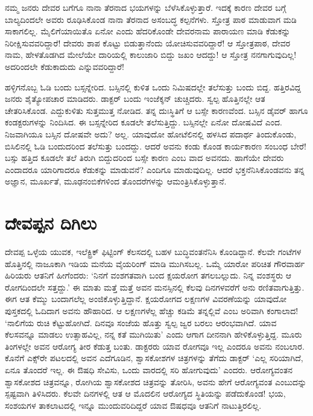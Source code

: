 ನಮ್ಮ ಜನರು ದೇವರ ಬಗೆಗೂ ನಾನಾ ತೆರನಾದ ಭಯಗಳನ್ನು ಬೆಳೆಸಿಕೊಳ್ಳುತ್ತಾರೆ. ಇದಕ್ಕೆ ಕಾರಣ ದೇವರ ಬಗ್ಗೆ ಬಾಲ್ಯದಿಂದಲೇ ಅವರು ರೂಢಿಸಿಕೊಂಡ ನಾನಾ ತೆರನಾದ ಅಸಂಬದ್ಧ ಕಲ್ಪನೆಗಳು. ಸ್ತೋತ್ರ ಪಾಠ ಮಾಡುವಾಗ ಮಡಿ ಸಾಕಾಗಲಿಲ್ಲ. ಮೈಲಿಗೆಯಾಯಿತೊ ಏನೋ ಎಂದು ಹೆದರಿಕೊಂಡೇ ದೇವರನಾಮ ಪಾರಾಯಣ ಮಾಡಿ ಕೆಡುಕನ್ನು ನಿರೀಕ್ಷಿಸುವವರಿದ್ದಾರೆ! ದೇವರು ಶಾಪ ಕೊಟ್ಟು ಬಿಡುತ್ತಾನೆಂದು ಯೋಚಿಸುವವರಿದ್ದಾರೆ! ಆ ಸ್ತೋತ್ರಪಾಠ, ದೇವರ ನಾಮ, ಹೇಳತೊಡಗಿದ ಮೇಲೆಯೇ ದಾರಿಯಲ್ಲಿ ಕಾಲುಜಾರಿ ಬಿದ್ದು ಜಖಂ ಆದದ್ದು! ಆ ಸ್ತೋತ್ರ ನನಗಾಗುವುದಿಲ್ಲ! ಅದರಿಂದಲೇ ಕೆಡುಕಾದುದು ಎನ್ನುವವರಿದ್ದಾರೆ!

ಹಳ್ಳಿಗನೊಬ್ಬ ಓಡಿ ಬಂದು ಬಸ್ಸನ್ನೇರಿದ. ಬಸ್ಸಿನಲ್ಲಿ ಕುಳಿತ ಒಂದು ನಿಮಿಷದಲ್ಲೇ ತಲೆಸುತ್ತು ಬಂದು ಬಿದ್ದ. ಹತ್ತಿರವಿದ್ದ ಜನರು ಶೈತ್ಯೋಪಚಾರ ಮಾಡಿದರು. ಡಾಕ್ಟರ್ ಬಂದು ಇಂಜೆಕ್ಶನ್ ಚುಚ್ಚಿದರು. ಸ್ವಲ್ಪ ಹೊತ್ತಿನಲ್ಲೇ ಆತ ಚೇತರಿಸಿಕೊಂಡ. ಎದ್ದುಕುಳಿತು ಸುತ್ತಮುತ್ತ ನೋಡಿದ. ತನ್ನ ದುಃಸ್ಥಿತಿಗೆ ಆ ಬಸ್ಸೇ ಕಾರಣವೆಂದ. ಬಸ್ಸಿನ ಡೈವರ್ ಹಾಗೂ ಕಂಡಕ್ಟರುಗಳನ್ನು ನಿಂದಿಸಿದ. ಈ ಬಸ್ಸನ್ನೇರಿದ ಕೂಡಲೇ ತಲೆಸುತ್ತಿದ್ದು. ಬಸ್ಸಿನಲ್ಲೇ ಏನೋ ದೋಷವಿದೆ ಎಂದ. ನಿಜವಾಗಿಯೂ ಬಸ್ಸಿನ ದೋಷವೇ ಅದು? ಅಲ್ಲ. ಯಾವುದೋ ಹೋಟೆಲಿನಲ್ಲಿ ಹಳಸಿದ ಪದಾರ್ಥ ತಿಂದುಕೊಂಡು, ಬಿಸಿಲಿನಲ್ಲಿ ಓಡಿ ಬಂದುದರಿಂದ ತಲೆಸುತ್ತು ಬಂದದ್ದು. ಆದರೆ ಅವನು ಕಂಡು ಕೊಂಡ ಕಾರ್ಯಕಾರಣ ಸಂಬಂಧ ಬೇರೆ! ಬಸ್ಸು ಹತ್ತಿದ ಕೂಡಲೇ ತಲೆ ತಿರುಗಿ ಬಿದ್ದುದರಿಂದ ಬಸ್ಸೇ ಕಾರಣ ಎಂಬ ವಾದ ಅವನದು. ಹಾಗೆಯೇ ದೇವರು ಎಂದಾದರೂ ಯಾರಿಗಾದರೂ ಕೆಡುಕನ್ನು ಮಾಡುವನೆ? ಎಂದಿಗೂ ಮಾಡುವುದಿಲ್ಲ. ಆದರೆ ಭಕ್ತನೆನಿಸಿಕೊಂಡವನು ತನ್ನ ಅಜ್ಞಾನ, ಮೂರ್ಖತೆ, ಮೂಢನಂಬಿಕೆಗಳಿಂದ ತೊಂದರೆಗಳನ್ನು ಆಮಂತ್ರಿಸಿಕೊಳ್ಳುತ್ತಾನೆ.


\section*{ದೇವಪ್ಪನ ದಿಗಿಲು}

\vskip -6pt

ದೇವಪ್ಪ ಒಳ್ಳೆಯ ಯುವಕ, ಇಲೆಕ್ಟ್ರಿಕ್ ಫಿಟ್ಟಿಂಗ್ ಕೆಲಸದಲ್ಲಿ ಬಹಳ ಬುದ್ಧಿವಂತನೆನಿಸಿ ಕೊಂಡಿದ್ದಾನೆ. ಕೆಲವೇ ಗಂಟೆಗಳ ಹೊತ್ತಿನಲ್ಲಿ ನಾಜೂಕಾಗಿ ಇಡಿಯ ಮನೆಯ ವೈಯರಿಂಗ್ ಮಾಡಿ ಮುಗಿಸಬಲ್ಲ. ಒಮ್ಮೆ ಯಾರೋ ಪರಿಚಿತ ಗೌರವಾರ್ಹ ಹಿರಿಯರು ಆತನಿಗೆ ಹೀಗೆಂದರು: ‘ನಿನಗೆ ವಂಶಗತವಾಗಿ ಬಂದ ಕ್ಷಯರೋಗ ತಗಲಬಲ್ಲುದು. ನಿನ್ನ ವಂಶಸ್ಥರು ಆ ರೋಗದಿಂದಲೇ ಸತ್ತದ್ದು.’ ಈ ಮಾತು ಮತ್ತೆ ಮತ್ತೆ ಅವನ ಮನಸ್ಸಿನಲ್ಲಿ ಕೆಲವು ದಿನಗಳವರೆಗೆ ಅನು ರಣಿತವಾಗುತ್ತಿತ್ತು. ಈಗ ಆತ ಕೆಮ್ಮು ಬಂದಾಗಲೆಲ್ಲ ಅಂಜಿಕೊಳ್ಳುತ್ತಿದ್ದಾನೆ. ಕ್ಷಯರೋಗದ ಲಕ್ಷಣಗಳ ವಿವರಣೆಯನ್ನು ಯಾವುದೋ ಪುಸ್ತಕದಲ್ಲಿ ಓದಿದಾಗ ಅವನು ಹೌಹಾರಿದ. ಆ ಲಕ್ಷಣಗಳೆಲ್ಲ ಹೆಚ್ಚು ಕಡಿಮೆ ತನ್ನಲ್ಲಿವೆ ಎಂಬ ಅರಿವಾಗಿ ಕಂಗಾಲಾದ! ‘ನಾಲಿಗೆಯ ರುಚಿ ಕೆಟ್ಟುಹೋಗಿದೆ. ದಿನವೂ ಸಂಜೆಯ ಹೊತ್ತು ಸ್ವಲ್ಪ ಜ್ವರ ಬರಲು ಆರಂಭವಾಗಿದೆ. ಯಾವ ಕೆಲಸವನ್ನೂ ಮಾಡಲು ಉತ್ಸಾಹವಿಲ್ಲ, ನನ್ನ ಕತೆ ಮುಗಿಯಿತು’ ಎಂದು ಆಗಾಗ ದೀನನಾಗಿ ಹೇಳಿಕೊಳ್ಳುತ್ತಿದ್ದ. ಮೂರು ತಿಂಗಳಲ್ಲೇ ಅವನ ಆರೋಗ್ಯ ತೀರ ಕೆಡುತ್ತ ಬಂತು. ಡಾಕ್ಟರರು ಯಾವ ರೋಗವೂ ಇಲ್ಲ ಎಂದರೂ ಅವನು ನಂಬಲಾರ. ಕೊನೆಗೆ ಎಕ್ಸ್​ರೇ ಪಟಲದಲ್ಲಿ ಅವನ ಎದೆಗೂಡಿನ, ಶ್ವಾಸಕೋಶಗಳ ಚಿತ್ರಗಳನ್ನು ತೆಗೆದು ಡಾಕ್ಟರ್ ‘ಎಲ್ಲ ಸರಿಯಾಗಿದೆ, ಏನೂ ತೊಂದರೆ ಇಲ್ಲ. ಈ ಔಷಧಿ ಸೇವಿಸು, ಒಂದು ವಾರದಲ್ಲಿ ಸರಿ ಹೋಗುವುದು’ ಎಂದರು. ಆರೋಗ್ಯವಂತನ ಶ್ವಾಸಕೋಶದ ಚಿತ್ರವನ್ನೂ, ರೋಗಿಯ ಶ್ವಾಸಕೋಶದ ಚಿತ್ರವನ್ನು ತೋರಿಸಿ, ಅವನು ಹೇಗೆ ಆರೋಗ್ಯವಂತ ಎಂಬುದನ್ನು ಸ್ಪಷ್ಟವಾಗಿ ತಿಳಿಸಿದರು. ಕೆಲವೇ ದಿನಗಳಲ್ಲಿ ಆತ ಆ ಮೊದಲಿನ ಆರೋಗ್ಯದ ಸ್ಥಿತಿಯನ್ನು ಪಡೆದುಕೊಂಡ! ಭಯ, ಸಂಶಯಗಳ ತಾಕಲಾಟದಲ್ಲಿ ಇನ್ನೂ ಮುಂದುವರಿದಿದ್ದರೆ ಯಾವ ಔಷಧವೂ ಆತನಿಗೆ ನಾಟುತ್ತಿರಲಿಲ್ಲ.


